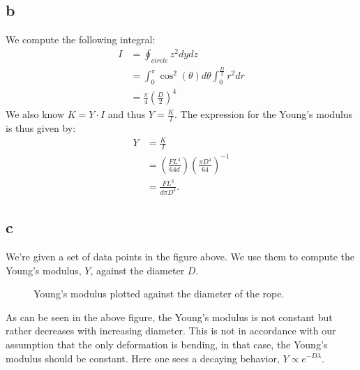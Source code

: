 \documentclass[a4paper]{article}
\begin{document}
\subsection*{b}
We compute the following integral:
\begin{align*}
    I &= \oint_{circle} z^2 dydz\\
    &= \int_0^\pi\cos^2(\theta) d\theta\int_0^{\frac{D}{2}}r^2dr\\
    &=\frac{\pi}{4}\left(\frac{D}{2}\right)^4
\end{align*}We also know $K = Y\cdot I$ and thus $Y = \frac{K}{I}$. The expression for the Young's modulus is thus given by:
\begin{align*}
    Y &= \frac{K}{I}\\
    &= \left(\frac{FL^3}{64d}\right)\left(\frac{\pi D^4}{64}\right)^{-1}\\
    &= \frac{FL^3}{d\pi D^4}.
\end{align*}

\subsection*{c}
We're given a set of data points in the figure above. We use them to compute the Young's modulus, $Y$, against the diameter $D$.
\begin{figure}[H]
    \centering
    \caption{Young's modulus plotted against the diameter of the rope.}
    \label{fig:task3c}
\end{figure}\noindent
As can be seen in the above figure, the Young's modulus is not constant but rather decreases with increasing diameter. This is not in accordance with our assumption that the only deformation is bending, in that case, the Young's modulus should be constant.
Here one sees a decaying behavior, $Y\propto e^{-D\lambda}$.
\end{document}
